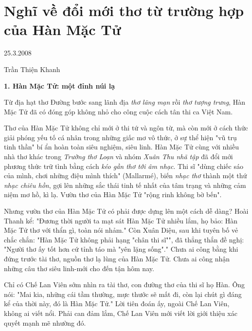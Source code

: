 \documentclass[../main.tex]{subfiles}
\begin{document}
\chapter{Nghĩ về đổi mới thơ từ trường hợp của Hàn Mặc Tử}

\begin{metadata}

\begin{flushright}25.3.2008\end{flushright}

Trần Thiện Khanh



\end{metadata}

\begin{multicols}{2}

\textbf{1. Hàn Mặc Tử: một đỉnh núi lạ} 
 
Từ địa hạt thơ Đường bước sang lãnh địa \textit{thơ lãng mạn} rồi \textit{thơ tượng trưng}, Hàn Mặc Tử đã có đóng góp không nhỏ cho công cuộc cách tân thi ca Việt Nam. 
 
Thơ của Hàn Mặc Tử không chỉ mới ở thi tứ và ngôn từ, mà còn mới ở cách thức giải phóng yếu tố cá nhân trong những giấc mơ vô thức, ở sự thể hiện "vũ trụ tinh thần" bí ẩn hoàn toàn siêu nghiệm, siêu linh. Hàn Mặc Tử cùng với nhiều nhà thơ khác trong \textit{Trường thơ Loạn} và nhóm \textit{Xuân Thu nhã tập} đã đổi mới phương thức trữ tình bằng cách \textit{kéo gần thơ tới âm nhạc}. Thi sĩ "dùng chiếc sáo của mình, chơi những điệu mình thích" (Mallarmé), biến \textit{nhạc thơ} thành một thứ \textit{nhạc chiêu hồn}, gợi lên những sắc thái tinh tế nhất của tâm trạng và những cảm niệm mơ hồ, kì lạ. Vườn thơ của Hàn Mặc Tử "rộng rinh không bờ bến". 
 
Nhưng vườn thơ của Hàn Mặc Tử có phải được dựng lên một cách dễ dàng? Hoài Thanh kể: "Đương thời người ta mạt sát Hàn Mặc Tử nhiều lắm, họ bảo: Hàn Mặc Tử thơ với thẩn gì, toàn nói nhảm." Còn Xuân Diệu, sau khi tuyên bố vẻ chắc chắn: "Hàn Mặc Tử không phải hạng "chân thi sĩ"", đã thẳng thắn đề nghị: "Người thơ ấy tốt hơn cứ tỉnh táo mà "yên lặng sống"." Chưa ai công bằng khi đứng trước tài thơ, nguồn thơ lạ lùng của Hàn Mặc Tử. Chưa ai công nhận những câu thơ siêu linh-mới cho đến tận hôm nay. 
 
Chỉ có Chế Lan Viên sớm nhìn ra tài thơ, con đường thơ của thi sĩ họ Hàn. Ông nói: "Mai kia, những cái tầm thường, mực thước sẽ mất đi, còn lại chút gì đáng kể của thời này, đó là Hàn Mặc Tử." Lời tiên đoán ấy, ngoài Chế Lan Viên, không ai viết nổi. Phải can đảm lắm, Chế Lan Viên mới viết lời giới thiệu xác quyết mạnh mẽ nhường đó. 
	 

\end{multicols}
\end{document}
